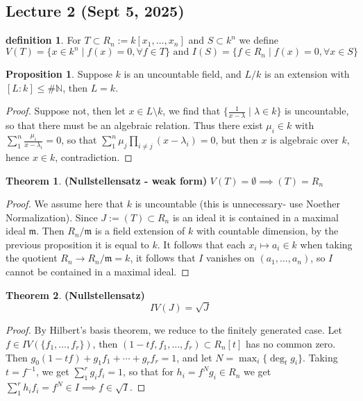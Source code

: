 \documentclass[10.5pt]{article}
\theoremstyle{definition}
\newtheorem{theorem}{Theorem}
\newtheorem{proposition}{Proposition}
\newtheorem{definition}{definition}
\newcommand{\set}[1]{\{#1\}}
\newcommand{\tand}{\text{ and }}
\begin{document}

    \subsection{Lecture 2 (Sept 5, 2025)}
    \begin{definition}
        For \(T \subset R_n := k[x_1,\hdots,x_n]\) and \(S \subset k^n\) we define \[V(T) = \set{x \in k^n \mid f(x) = 0, \forall f \in T} \tand I(S) = \set{f \in R_n \mid f(x) = 0, \forall x \in S}\]
    \end{definition}
    \begin{proposition}
        Suppose \(k\) is an uncountable field, and \(L/k\) is an extension with \([L:k] \leq \#\mathbb{N}\), then \(L = k\).
    \end{proposition}
    \begin{proof}
        Suppose not, then let \(x \in L\setminus k\), we find that \(\set{\frac{1}{x-\lambda} \mid \lambda \in k}\) is uncountable, so that there must be an algebraic relation. Thus there exist \(\mu_i \in k\) with \(\sum_1^n \frac{\mu_i}{x - \lambda_i} = 0\), so that \(\sum_1^n \mu_j \prod_{i \neq j}(x - \lambda_i) = 0\), but then \(x\) is algebraic over \(k\), hence \(x \in k\), contradiction.
    \end{proof}
    \begin{theorem}\textbf{(Nullstellensatz - weak form)}
        \(V(T) = \emptyset \implies (T) = R_n\)
    \end{theorem}
    \begin{proof}
        We assume here that \(k\) is uncountable (this is unnecessary- use Noether Normalization). Since \(J := (T) \subset R_n\) is an ideal it is contained in a maximal ideal \(\mathfrak{m}\). Then \(R_n/\mathfrak{m}\) is a field extension of \(k\) with countable dimension, by the previous proposition it is equal to \(k\). It follows that each \(x_i \mapsto a_i \in k\) when taking the quotient \(R_n \to R_n/\mathfrak{m} = k\), it follows that \(I\) vanishes on \((a_1,\hdots,a_n)\), so \(I\) cannot be contained in a maximal ideal.
    \end{proof}
    \begin{theorem}\textbf{(Nullstellensatz)}
        \[IV(J) = \sqrt{J}\]
    \end{theorem}
    \begin{proof}
        By Hilbert's basis theorem, we reduce to the finitely generated case. Let \(f \in IV(\set{f_1,\hdots,f_r})\), then \((1-tf,f_1,\hdots,f_r) \subset R_n[t]\) has no common zero. Then \(g_0(1-tf) + g_1f_1 + \cdots + g_rf_r = 1\), and let \(N = \max_i\set{\deg_tg_i}\). Taking \(t = f^{-1}\), we get \(\sum_1^r g_if_i = 1\), so that for \(h_i = f^Ng_i \in R_n\) we get \(\sum_1^r h_if_i = f^N \in I \implies f \in \sqrt{I}\).
    \end{proof}
    
\end{document}
